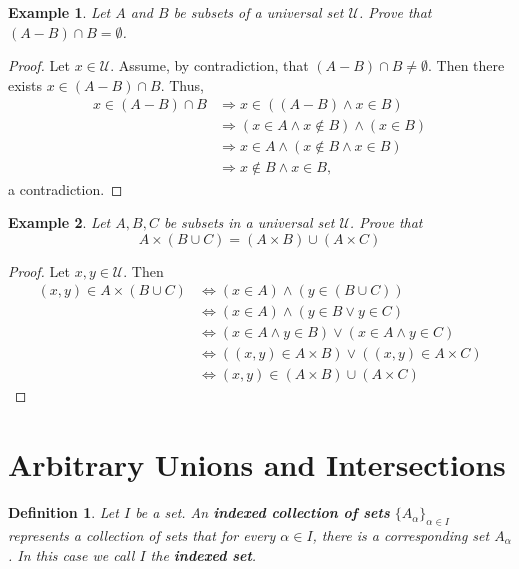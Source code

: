 \documentclass[10pt,reqno]{book}
\theoremstyle{plain}
\newtheorem{definition}[theorem]{Definition}
\newtheorem{example}{Example}
\def\U{\mathcal{U}}
\begin{document}
	\begin{example}
		Let $ A $ and $ B $ be subsets of a universal set $ \U $. Prove that $ (A-B) \cap B = \emptyset $.
	\end{example}
	
	\begin{proof}
		Let $ x \in \U $. Assume, by contradiction, that $ (A-B) \cap B \neq \emptyset $. Then there exists $ x \in (A-B) \cap B $. Thus,
		\begin{align*}
			x \in (A-B) \cap B &\Rightarrow x \in ((A-B) \wedge x \in B) \\	
			&\Rightarrow (x \in A \wedge x \notin B) \wedge (x \in B)\\
			&\Rightarrow x \in A \wedge (x \notin B \wedge x \in B)\\
			&\Rightarrow x \notin B \wedge x \in B,		
		\end{align*}
		a contradiction.
	\end{proof}

	\begin{example}
		Let $ A,B,C $ be subsets in a universal set $ \U $. Prove that 
		\[ A \times (B \cup C) = (A \times B) \cup (A \times C) \]
	\end{example}
	
	\begin{proof}
		Let $ x,y \in \U $. Then
		\begin{align*}
			(x,y) \in A \times (B \cup C) &\Leftrightarrow (x \in A) \wedge (y \in (B \cup C))\\
			&\Leftrightarrow (x \in A) \wedge (y \in B \vee y \in C)\\
			&\Leftrightarrow (x \in A \wedge y \in B) \vee (x \in A \wedge y \in C)\\
			&\Leftrightarrow ((x,y) \in A \times B) \vee ((x,y) \in A \times C)\\
			&\Leftrightarrow (x,y) \in (A \times B) \cup (A \times C)
		\end{align*}
	\end{proof}
	
	\section{Arbitrary Unions and Intersections}
	
	\begin{definition}
		Let $ I $ be a set. An \textbf{indexed collection of sets} $ \{A_{\alpha}\}_{\alpha \in I} $ represents a collection of sets that for every $ \alpha \in I $, there is a corresponding set $ A_{\alpha} $. In this case we call $ I $ the \textbf{indexed set}.
	\end{definition}
\end{document}
